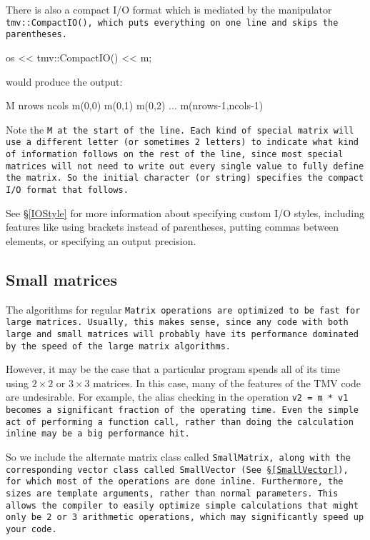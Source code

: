 There is also a compact I/O format which is mediated by the manipulator
\tt{tmv::CompactIO()}, which puts everything on one line and skips the parentheses.
\begin{tmvcode}
os << tmv::CompactIO() << m;
\end{tmvcode}
would produce the output:
\begin{tmvcode}
M nrows ncols m(0,0) m(0,1) m(0,2) ... m(nrows-1,ncols-1)
\end{tmvcode}
Note the \tt{M} at the start of the line.  Each kind of special matrix will use a different letter (or sometimes 2 letters) to indicate what kind of information follows on the rest of the line, since most special matrices will not need to write out every single value to fully define the matrix.  So the initial character (or string) specifies the compact I/O format that follows.

See \S\ref{IOStyle} for more information about specifying custom I/O styles, including
features like using brackets instead of parentheses, putting commas between elements,
or specifying an output precision.  

\subsection{Small matrices}
\label{SmallMatrix}

The algorithms for regular \tt{Matrix} operations are optimized to be
fast for large matrices.  Usually, this makes sense, since any code with
both large and small matrices will probably have its performance dominated
by the speed of the large matrix algorithms.

However, it may be the case that a particular program spends all of its
time using $2 \times 2$ or $3 \times 3$ matrices.  In this case, 
many of the features of the TMV code are undesirable.  For example, 
the alias checking in the operation \tt{v2 = m * v1} becomes a significant
fraction of the operating time.  Even the simple act of performing a function
call, rather than doing the calculation inline may be a big performance hit.

So we include the alternate matrix class called \tt{SmallMatrix}, along 
with the corresponding vector class called \tt{SmallVector} (See \S\ref{SmallVector}), 
for which most of 
the operations are done inline.  Furthermore, the sizes are template arguments,
rather than normal parameters.  This allows the compiler to easily optimize
simple calculations that might only be 2 or 3 arithmetic operations, which
may significantly speed up your code.

